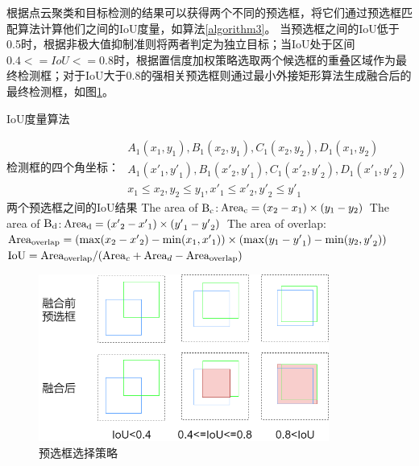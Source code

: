 根据点云聚类和目标检测的结果可以获得两个不同的预选框，将它们通过预选框匹配算法计算他们之间的IoU度量，如算法\ref{algorithm3}。
当预选框之间的IoU低于0.5时，根据非极大值抑制准则将两者判定为独立目标；当IoU处于区间$0.4<=IoU<=0.8$时，根据置信度加权策略选取两个候选框的重叠区域作为最终检测框；对于IoU大于0.8的强相关预选框则通过最小外接矩形算法生成融合后的最终检测框，如图\ref{iou}。
\begin{algorithm}[!h]
    \caption{IoU度量算法}
    \label{algorithm3}
    \renewcommand{\algorithmicrequire}{\textbf{Input:}}
    \renewcommand{\algorithmicensure}{\textbf{Output:}}
    \renewcommand{\algorithmiccomment}[1]{\hfill $\triangleright$ #1}
    \begin{algorithmic}[1]
        \REQUIRE 检测框的四个角坐标：
        $\begin{array}{l}
            {A_1}\left( {{x_1},{y_1}} \right),{B_1}\left( {{x_2},{y_1}} \right),{C_1}\left( {{x_2},{y_2}} \right),{D_1}\left( {{x_1},{y_2}} \right)\\
            {A_1}\left( {{{x'}_1},{{y'}_1}} \right),{B_1}\left( {{{x'}_2},{{y'}_1}} \right),{C_1}\left( {{{x'}_2},{{y'}_2}} \right),{D_1}\left( {{{x'}_1},{{y'}_2}} \right)\\
            {x_1} \le {x_2},{y_2} \le {y_1},{{x'}_1} \le {{x'}_2},{{y'}_2} \le {{y'}_1}
            \end{array}$  %
        \ENSURE 两个预选框之间的IoU结果   %
        \STATE  The area of ${{\rm{B}}_{{\rm{c }}}}$:${\rm{Are}}{{\rm{a}}_{\rm{c}}} = ({x_2} - {x_1}) \times ({y_1} - {y_2})$
        \STATE  The area of ${{\rm{B}}_{{\rm{d }}}}$:${\rm{Are}}{{\rm{a}}_{\rm{d}}} = ({{x'}_2} - {{x'}_1}) \times ({{y'}_1} - {{y'}_2})$
		\STATE  The area of overlap:\\
        ${\rm{Are}}{{\rm{a}}_{{\rm{overlap}}}} = (\max ({x_2} - {{x'}_2}) - \min ({x_1},{{x'}_1})) \times (\max ({y_1} - {{y'}_1}) - \min ({y_2},{{y'}_2}))$
		\STATE  ${\rm{IoU}} = {\rm{Are}}{{\rm{a}}_{{\rm{overlap}}}}/({\rm{Are}}{{\rm{a}}_c} + {\rm{Are}}{{\rm{a}}_d} - {\rm{Are}}{{\rm{a}}_{{\rm{overlap}}}})$
    \end{algorithmic}
\end{algorithm}
\begin{figure}[htbp]
    \centering
    \includegraphics[width=0.85\textwidth]{Fig/iou.png}
    \caption{\label{iou}预选框选择策略}
\end{figure}

